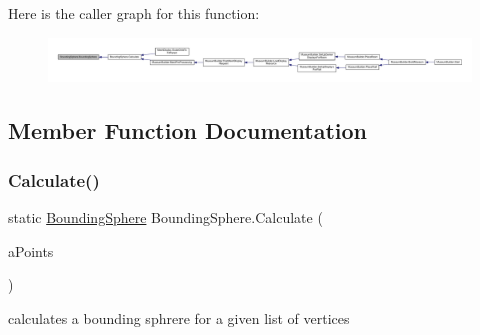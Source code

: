 Here is the caller graph for this function\+:
\nopagebreak
\begin{figure}[H]
\begin{center}
\leavevmode
\includegraphics[width=350pt]{class_bounding_sphere_ad35e7960a2e532e8f7cbebbca2136ef7_icgraph}
\end{center}
\end{figure}


\subsection{Member Function Documentation}
\mbox{\label{class_bounding_sphere_a29c277d13a701089666b94fabf3c87d6}} 
\subsubsection{\texorpdfstring{Calculate()}{Calculate()}}
{\footnotesize\ttfamily static \mbox{\hyperlink{class_bounding_sphere}{Bounding\+Sphere}} Bounding\+Sphere.\+Calculate (\begin{DoxyParamCaption}\item[{I\+Enumerable$<$ Vector3 $>$}]{a\+Points }\end{DoxyParamCaption})\hspace{0.3cm}{\ttfamily [static]}}



calculates a bounding sphrere for a given list of vertices 


